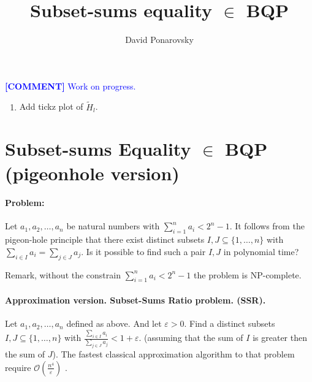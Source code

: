 \documentclass{article}
\begin{document}
\newcommand{\commentt}[1]{\textcolor{blue}{ \textbf{[COMMENT]} #1}}
\newcommand{\ctt}[1]{\commentt{#1}}
\newcommand{\prb}[1]{ \mathbf{Pr} \left[ {#1} \right]}
\newcommand{\onotation}[1]{\(\mathcal{O} \left( {#1}  \right) \)}
\newcommand{\ona}[1]{\onotation{#1}}

\newcommand{\GG}{\tilde{G} }
\newcommand{\TGG}{\(\tilde{G}\) }
\newcommand{\Prb}[1]{ \mathbf{Pr}\left[ {#1} \right] }
\renewcommand\qedsymbol{$\blacksquare$}

\newcommand{\Htr}[1]{\tilde{H}_{#1}}
\newcommand{\Ht}{\Htr{l}}
\newcommand{\Htp}[2]{ \Htr{#1}\left(\ket{#2}\right)  }
\newcommand{\ps}{\ket{\psi}}
\newcommand{\hpst}{\left( H, \ps \right)}
\newcommand{\Ham}{Hamiltonian }

\title{Subset-sums equality \( \in \) BQP}
\author{David Ponarovsky}
\maketitle

\paragraph{} \ctt{Work on progress.} 
\begin{enumerate}
    \item Add tickz plot of \(\Ht\).
\end{enumerate}

\section{Subset-sums Equality \(\in\) BQP (pigeonhole version)} 
\paragraph{Problem:} Let  \( a_1,a_2,\ldots,a_n\) be natural numbers with \( \sum_{i=1}^{n}{a_i} < 2^{n} - 1 \). It follows from the pigeon-hole principle that there exist distinct subsets \( I,J \subseteq \{1,\ldots,n\} \) with \( \sum_{i \in I} a_i = \sum_{j \in J} a_j\). Is it possible to find such a pair \( I, J\) in polynomial time? 

Remark, without the constrain  \( \sum_{i=1}^{n}{a_i} < 2^{n} - 1 \) the problem is NP-complete. 
\paragraph{Approximation version. Subset-Sums Ratio problem. (SSR).} Let \( a_1,a_2,\ldots,a_n\) defined as above. And let \( \varepsilon > 0  \). Find a   distinct subsets \( I,J \subseteq \{1,\ldots,n\} \) with \( \frac{\sum_{i \in I} a_i}{\sum_{j \in J} a_j} < 1 + \varepsilon \).  (assuming that the sum of \(I\) is greater then the sum of \(J\)). The fastest classical approximation algorithm to that problem require \ona{ \frac{n^4}{\varepsilon} } \cite{Melissinos_2018}. 
\end{document}
